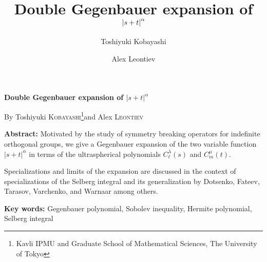 \documentclass[12pt]{article}
\title{\bf Double Gegenbauer expansion of $\myabs{s+t}^\alpha$}
\author{Toshiyuki Kobayashi \and Alex Leontiev}
\newcommand{\myabs}[1]{\left|#1\right|}
\numberwithin{equation}{section}
\newcommand{\mygrammarfootnote}[1]{}
\begin{document}
\makeatletter
\renewcommand{\thefootnote}{\ifcase\value{footnote}\or*)\or
**)\or(***)\or(****)\or(\#)\or(\#\#)\or(\#\#\#)\or(\#\#\#\#)\or($\infty$)\fi}
\makeatother

    \begin{center}
        {\large\bf Double Gegenbauer expansion of $\myabs{s+t}^\alpha$\par}
\vspace{1em}
{\small By Toshiyuki \textsc{Kobayashi}\footnote{Kavli IPMU and Graduate School of Mathematical Sciences, The University of Tokyo}\footnotemark and Alex \textsc{Leontiev}\footnotemark[\value{footnote}]}
\end{center}
\vspace{2\baselineskip}
\renewcommand{\thefootnote}{\arabic{footnote}}
{
{
	\hspace{1.5cm}\begin{minipage}[]{0.8\textwidth}
  \quad\textbf{Abstract:}\quad
  Motivated by the study of symmetry breaking operators for indefinite
  orthogonal groups, we give a Gegenbauer expansion of the two variable
  function $| s + t |^{\alpha}$ in terms of the ultraspherical polynomials
  $C_{\ell}^{\lambda} (s)$ and $C^{\mu}_m (t)$.
  
  Specializations and limits of the expansion are discussed in the context of
  specializations of the Selberg integral and its
  generalization\mygrammarfootnote{maybe, ``generalization'' should be in plural (i.e.
  ``generalizations'')?} by Dotsenko, Fateev, Tarasov, Varchenko, and Warnaar
  among others.

\quad\textbf{Key words:}\quad
Gegenbauer polynomial, Sobolev inequality, Hermite polynomial, Selberg integral\mygrammarfootnote{maybe, dot here?}
\end{minipage}
}}

\vspace{2em}
\end{document}
